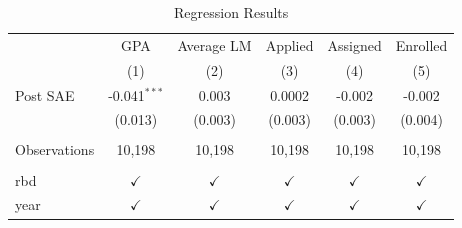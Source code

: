 \begin{table}[htbp]
   \caption{\label{tab:reg_results} Regression Results}
   \bigskip
   \centering
   \begin{tabular}{lccccc}
      \toprule
                   & GPA            & Average LM    & Applied       & Assigned      & Enrolled\\  
                   & (1)            & (2)           & (3)           & (4)           & (5)\\  
      \midrule 
      Post SAE     & -0.041$^{***}$ & 0.003         & 0.0002        & -0.002        & -0.002\\   
                   & (0.013)        & (0.003)       & (0.003)       & (0.003)       & (0.004)\\   
       \\
      Observations & 10,198         & 10,198        & 10,198        & 10,198        & 10,198\\  
       \\
      rbd          & $\checkmark$   & $\checkmark$  & $\checkmark$  & $\checkmark$  & $\checkmark$\\   
      year         & $\checkmark$   & $\checkmark$  & $\checkmark$  & $\checkmark$  & $\checkmark$\\   
      \bottomrule
   \end{tabular}
\end{table}
